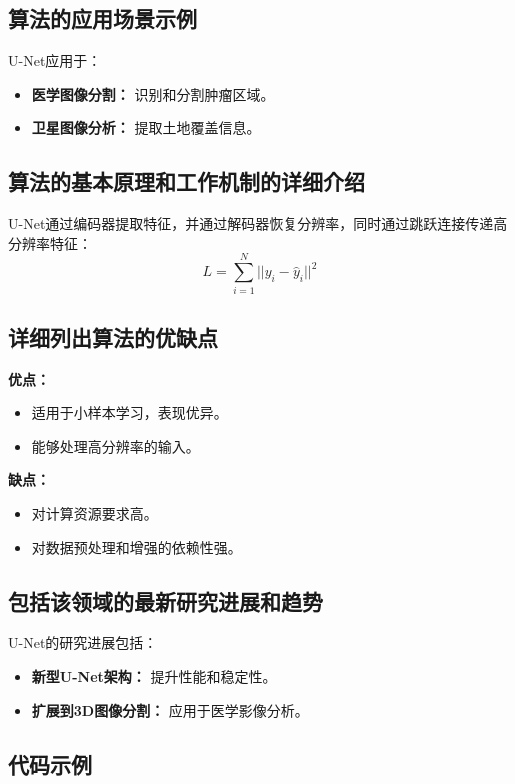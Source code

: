 \subsection*{算法的应用场景示例}
U-Net应用于：
\begin{itemize}
    \item \textbf{医学图像分割：} 识别和分割肿瘤区域。
    \item \textbf{卫星图像分析：} 提取土地覆盖信息。
\end{itemize}

\subsection*{算法的基本原理和工作机制的详细介绍}
U-Net通过编码器提取特征，并通过解码器恢复分辨率，同时通过跳跃连接传递高分辨率特征：
\[
    L = \sum_{i=1}^{N} || y_i - \hat{y}_i ||^2
\]

\subsection*{详细列出算法的优缺点}
\textbf{优点：}
\begin{itemize}
    \item 适用于小样本学习，表现优异。
    \item 能够处理高分辨率的输入。
\end{itemize}

\textbf{缺点：}
\begin{itemize}
    \item 对计算资源要求高。
    \item 对数据预处理和增强的依赖性强。
\end{itemize}

\subsection*{包括该领域的最新研究进展和趋势}
U-Net的研究进展包括：
\begin{itemize}
    \item \textbf{新型U-Net架构：} 提升性能和稳定性。
    \item \textbf{扩展到3D图像分割：} 应用于医学影像分析。
\end{itemize}
\subsection*{代码示例}
\begin{lstlisting}

\end{lstlisting}


